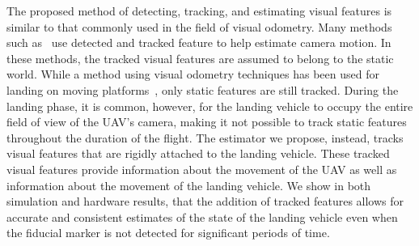 The proposed method of detecting, tracking, and estimating visual features is
similar to that commonly used in the field of visual odometry. Many methods such
as~\cite{qin2018vins,leutenegger2013keyframe,mourikis2007multi,mur2015orb} use
detected and tracked feature to help estimate camera motion.
In these methods, the tracked visual features are assumed to belong to the
static world. While a method using visual odometry techniques has been used for landing on
moving platforms~\cite{falanga2017vision}, only static features are
still tracked. During the landing phase, it is common, however, for the landing vehicle
to occupy the entire field of view of the UAV's camera, making it not possible
to track static features throughout the duration of the flight.
The estimator we propose, instead, tracks
visual features that are rigidly attached to the landing vehicle. These tracked
visual features provide information about the movement of the UAV as well as
information about the movement of the landing vehicle. We show in both
simulation and hardware results, that the addition of tracked features allows
for accurate and consistent estimates of the state of the landing vehicle even
when the fiducial marker is not detected for significant periods of time.

